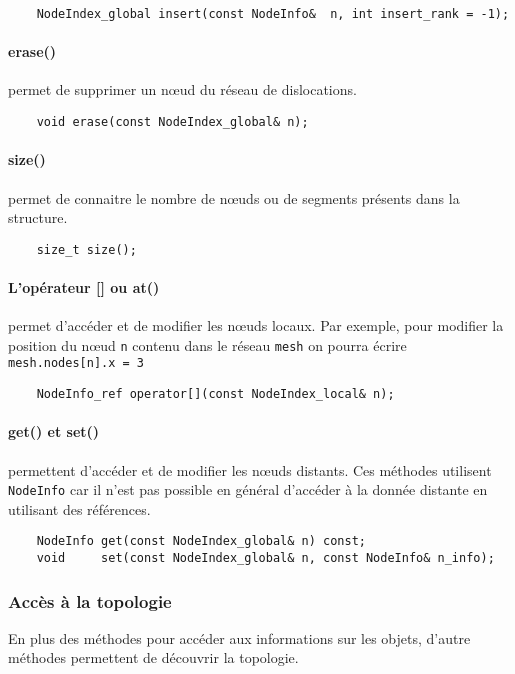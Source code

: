 \begin{verbatim}
	NodeIndex_global insert(const NodeInfo&  n, int insert_rank = -1);
\end{verbatim}

\paragraph{erase()} permet de supprimer un nœud du réseau de dislocations. 
\begin{verbatim}
	void erase(const NodeIndex_global& n);
\end{verbatim}

\paragraph{size()} permet de connaitre le nombre de nœuds ou de segments présents dans la structure.
\begin{verbatim}
	size_t size();
\end{verbatim}

\paragraph{L'opérateur [] ou at()} permet d'accéder et de modifier les nœuds locaux. Par exemple, pour modifier la position du nœud \verb|n| contenu dans le réseau \verb|mesh| on pourra écrire \verb|mesh.nodes[n].x = 3|
\begin{verbatim}
	NodeInfo_ref operator[](const NodeIndex_local& n);
\end{verbatim}

\paragraph{get() et set()} permettent d'accéder et de modifier les nœuds distants. Ces méthodes utilisent \verb|NodeInfo| car il n'est pas possible en général d'accéder à la donnée distante en utilisant des références.
\begin{verbatim}
	NodeInfo get(const NodeIndex_global& n) const;
	void     set(const NodeIndex_global& n, const NodeInfo& n_info);
\end{verbatim}

\subsubsection{Accès à la topologie}

En plus des méthodes pour accéder aux informations sur les objets, d'autre méthodes permettent de découvrir la topologie.


